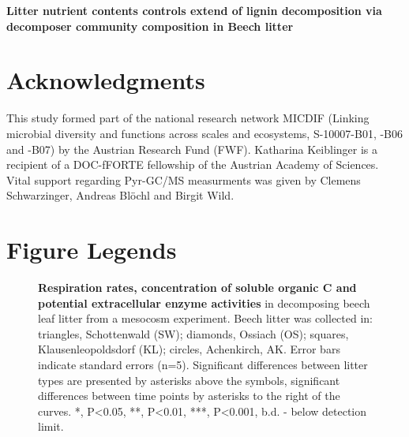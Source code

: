 \documentclass[10pt]{article}
\date{}
\begin{document}


\begin{flushleft}
{\Large
\textbf{Litter nutrient contents controls extend of lignin decomposition via decomposer community composition in Beech litter }
}
\\

\newpage


\linenumbers %
\newpage%





\section*{Acknowledgments}
This study formed part of the national research network MICDIF (Linking microbial diversity and functions across scales and ecosystems, S-10007-B01, -B06 and -B07) by the Austrian Research Fund (FWF). Katharina Keiblinger is a recipient of a DOC-fFORTE fellowship of the Austrian Academy of Sciences. Vital support regarding Pyr-GC/MS measurments was given by Clemens Schwarzinger, Andreas Bl\"{o}chl and Birgit Wild.



\newpage
\section*{Figure Legends}

\begin{figure}[!h]
\begin{center}
\end{center}
\caption{
{\bf Respiration rates, concentration of soluble organic C and potential extracellular enzyme activities} in decomposing beech leaf litter from a mesocosm experiment. Beech litter was collected in: triangles, Schottenwald (SW); diamonds, Ossiach (OS); squares, Klausenleopoldsdorf (KL); circles, Achenkirch, AK. Error bars indicate standard errors (n=5). Significant differences between litter types are presented by asterisks above the symbols, significant differences between time points by asterisks to the right of the curves. *, P\textless 0.05, **, P\textless 0.01, ***, P\textless 0.001, b.d. - below detection limit.}
\label{fig:enz}
\end{figure}


\end{flushleft}
\end{document}
